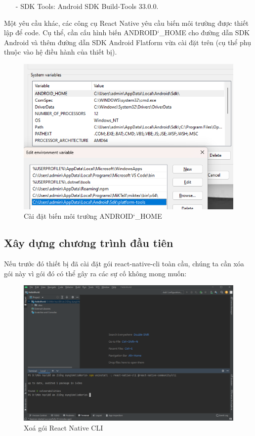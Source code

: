 \begin{enumerate}
\begin{enumerate}
        \item[-] SDK Tools: Android SDK Build-Tools 33.0.0.
    \end{enumerate}
    Một yêu cầu khác, các công cụ React Native yêu cầu biến môi trường được thiết lập để code. Cụ thể, cần cấu hình biến ANDROID\char`_HOME cho đường dẫn SDK Android và thêm đường dẫn SDK Android Flatform vừa cài đặt trên (cụ thể phụ thuộc vào hệ điều hành của thiết bị).
    \begin{figure}[!ht]
        \centering
        \includegraphics[scale=0.5]{images/configVariable.png}
        \caption{Cài đặt biến môi trường ANDROID\char`_HOME}
    \end{figure}
\end{enumerate}

\subsection{Xây dựng chương trình đầu tiên}
Nếu trước đó thiết bị đã cài đặt gói react-native-cli toàn cầu, chúng ta cần xóa gói này vì gói đó có thể gây ra các sự cố không mong muốn:
\begin{figure}[!ht]
    \centering
    \includegraphics[width=1\textwidth]{images/deleteReactnativeCLI.png}
    \caption{Xoá gói React Native CLI}
\end{figure}

